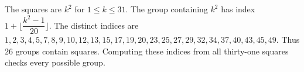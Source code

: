 The squares are $k^2$ for $1\le k\le31$. The group containing $k^2$ has index $1+\lfloor\dfrac{k^2-1}{20}\rfloor$. The distinct indices are $1,2,3,4,5,7,8,9,10,12,13,15,17,19,20,23,25,27,29,32,34,37,40,43,45,49$. Thus $\boxed{26}$ groups contain squares. Computing these indices from all thirty-one squares checks every possible group.
